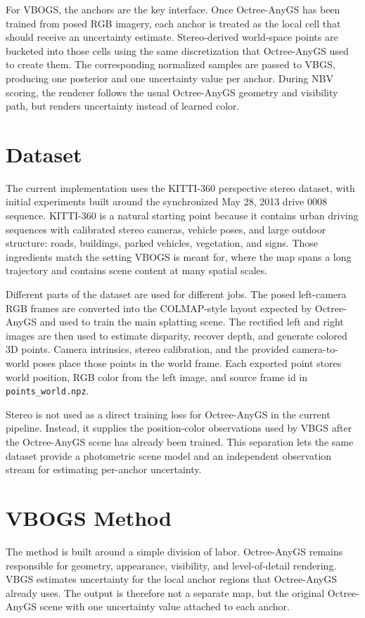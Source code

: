\documentclass{article}
\begin{document}
For VBOGS, the anchors are the key interface. Once Octree-AnyGS has been trained from posed RGB imagery, each anchor is treated as the local cell that should receive an uncertainty estimate. Stereo-derived world-space points are bucketed into those cells using the same discretization that Octree-AnyGS used to create them. The corresponding normalized samples are passed to VBGS, producing one posterior and one uncertainty value per anchor. During NBV scoring, the renderer follows the usual Octree-AnyGS geometry and visibility path, but renders uncertainty instead of learned color.

\section{Dataset}
The current implementation uses the KITTI-360 perspective stereo dataset, with initial experiments built around the synchronized May 28, 2013 drive 0008 sequence. KITTI-360 is a natural starting point because it contains urban driving sequences with calibrated stereo cameras, vehicle poses, and large outdoor structure: roads, buildings, parked vehicles, vegetation, and signs. Those ingredients match the setting VBOGS is meant for, where the map spans a long trajectory and contains scene content at many spatial scales.

Different parts of the dataset are used for different jobs. The posed left-camera RGB frames are converted into the COLMAP-style layout expected by Octree-AnyGS and used to train the main splatting scene. The rectified left and right images are then used to estimate disparity, recover depth, and generate colored 3D points. Camera intrinsics, stereo calibration, and the provided camera-to-world poses place those points in the world frame. Each exported point stores world position, RGB color from the left image, and source frame id in \texttt{points\_world.npz}.

Stereo is not used as a direct training loss for Octree-AnyGS in the current pipeline. Instead, it supplies the position-color observations used by VBGS after the Octree-AnyGS scene has already been trained. This separation lets the same dataset provide a photometric scene model and an independent observation stream for estimating per-anchor uncertainty.

\section{VBOGS Method}
The method is built around a simple division of labor. Octree-AnyGS remains responsible for geometry, appearance, visibility, and level-of-detail rendering. VBGS estimates uncertainty for the local anchor regions that Octree-AnyGS already uses. The output is therefore not a separate map, but the original Octree-AnyGS scene with one uncertainty value attached to each anchor.
\end{document}

